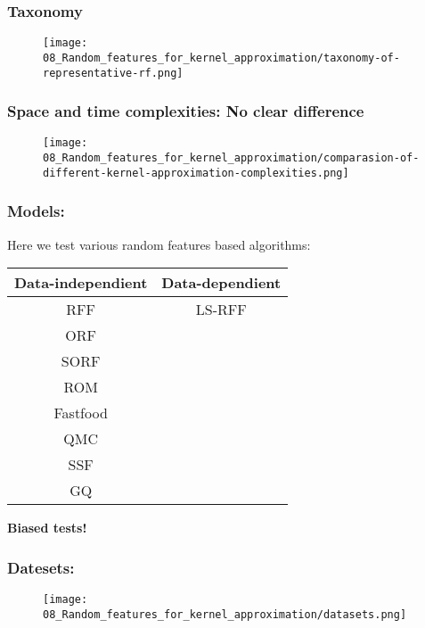 \begin{frame}
  \frametitle{Taxonomy}

  \begin{figure}[t]
    \texttt{[image: 08\_Random\_features\_for\_kernel\_approximation/taxonomy-of-representative-rf.png]}
    \centering
  \end{figure}
\end{frame}

\begin{frame}
  \frametitle{Space and time complexities: No clear difference}
  \begin{figure}[t]
    \texttt{[image: 08\_Random\_features\_for\_kernel\_approximation/comparasion-of-different-kernel-approximation-complexities.png]}
    \centering
  \end{figure}
  
\end{frame}

\begin{frame}
  \frametitle{Models:}

  Here we test various random features based algorithms:
  
  \begin{center}
    \begin{tabular}{|c|c|}
    \hline
    Data-independient & Data-dependient \\
    \hline
    RFF & LS-RFF\\
    ORF & \\
    SORF & \\
    ROM & \\
    Fastfood & \\
    QMC & \\
    SSF & \\
    GQ & \\
    \hline
    \end{tabular}
    \end{center}
    
    

\textbf{Biased tests!}
\end{frame}

\begin{frame}
  \frametitle{Datesets: }

  \begin{figure}[t]
    \texttt{[image: 08\_Random\_features\_for\_kernel\_approximation/datasets.png]}
    \centering
  \end{figure}

\end{frame}
  

